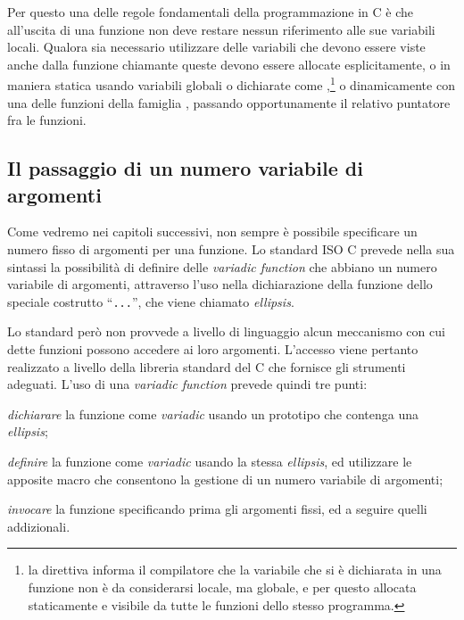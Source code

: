 Per questo una delle regole fondamentali della programmazione in C è che
all'uscita di una funzione non deve restare nessun riferimento alle sue
variabili locali. Qualora sia necessario utilizzare delle variabili che devono
essere viste anche dalla funzione chiamante queste devono essere allocate
esplicitamente, o in maniera statica usando variabili globali o dichiarate
come ,\footnote{la direttiva  informa il
  compilatore che la variabile che si è dichiarata in una funzione non è da
  considerarsi locale, ma globale, e per questo allocata staticamente e
  visibile da tutte le funzioni dello stesso programma.} o dinamicamente con
una delle funzioni della famiglia , passando opportunamente il
relativo puntatore fra le funzioni.


\subsection{Il passaggio di un numero variabile di argomenti}
\label{sec:proc_variadic}


Come vedremo nei capitoli successivi, non sempre è possibile specificare un
numero fisso di argomenti per una funzione.  Lo standard ISO C prevede nella
sua sintassi la possibilità di definire delle \textit{variadic function} che
abbiano un numero variabile di argomenti, attraverso l'uso nella dichiarazione
della funzione dello speciale costrutto ``\texttt{...}'', che viene chiamato
\textit{ellipsis}.

Lo standard però non provvede a livello di linguaggio alcun meccanismo con cui
dette funzioni possono accedere ai loro argomenti.  L'accesso viene pertanto
realizzato a livello della libreria standard del C che fornisce gli strumenti
adeguati.  L'uso di una \textit{variadic function} prevede quindi tre punti:
\begin{itemize*}
\item \textsl{dichiarare} la funzione come \textit{variadic} usando un
  prototipo che contenga una \textit{ellipsis};
\item \textsl{definire} la funzione come \textit{variadic} usando la stessa
  \textit{ellipsis}, ed utilizzare le apposite macro che consentono la
  gestione di un numero variabile di argomenti;
\item \textsl{invocare} la funzione specificando prima gli argomenti fissi, ed
  a seguire quelli addizionali.
\end{itemize*}

